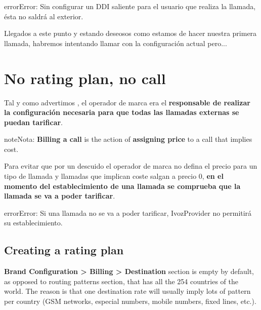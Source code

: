 \documentclass[letterpaper,10pt,spanish]{sphinxmanual}
\begin{document}
\begin{notice}{error}{Error:}
Sin configurar un DDI saliente para el usuario que realiza la llamada, ésta no saldrá al exterior.
\end{notice}

Llegados a este punto y estando deseosos como estamos de hacer nuestra primera llamada, habremos intentando llamar con la configuración actual pero...


\section{No rating plan, no call}
\label{getting_started/external_outgoing_calls/noplan_nocall:no-rating-plan-no-call}\label{getting_started/external_outgoing_calls/noplan_nocall:noplan-nocall}\label{getting_started/external_outgoing_calls/noplan_nocall::doc}
Tal y como advertimos {\hyperref[basic_concepts/operation_roles/index:brand\string-responsibilities]{}}, el operador de marca era el \textbf{responsable de realizar la configuración necesaria para que todas las llamadas externas se puedan tarificar}.

\begin{notice}{note}{Nota:}
\textbf{Billing a call} is the action of \textbf{assigning price} to a call that implies
cost.
\end{notice}

Para evitar que por un descuido el operador de marca no defina el precio para un tipo de llamada y llamadas que implican coste salgan a precio 0, \textbf{en el momento del establecimiento de una llamada se comprueba que la llamada se va a poder tarificar}.

\begin{notice}{error}{Error:}
Si una llamada no se va a poder tarificar, IvozProvider no permitirá su establecimiento.
\end{notice}


\subsection{Creating a rating plan}
\label{getting_started/external_outgoing_calls/noplan_nocall:creating-a-rating-plan}
\textbf{Brand Configuration \textgreater{} Billing \textgreater{} Destination} section is empty by default, as opposed to routing patterns section,
that has all the 254 countries of the world. The reason is that one destination rate
will usually imply lots of pattern per country (GSM networks, especial numbers,
mobile numbers, fixed lines, etc.).
\end{document}
